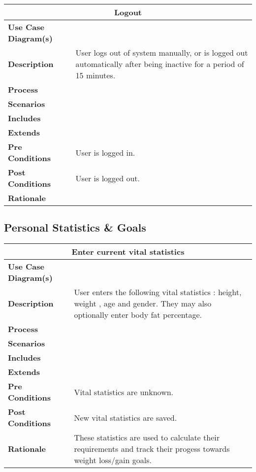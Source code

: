 \documentclass[12pt]{article}
\begin{document}
\begin{center}
\begin{tabularx}{\textwidth}{ |X|X|}
\hline
\multicolumn{2}{|c|}{\textbf{Logout}}\\
\hline
\hline
\textbf{Use Case Diagram(s)} & \\ \hline
\textbf{Description} &  User logs out of system manually, or is logged out automatically after being inactive for a period of 15 minutes. \\ \hline
\textbf{Process} & \\ \hline
\textbf{Scenarios} & \\ \hline
\textbf{Includes} & \\ \hline
\textbf{Extends} & \\ \hline
\textbf{Pre Conditions} & User is logged in.\\ \hline
\textbf{Post Conditions} & User is logged out.\\ \hline
\textbf{Rationale} & \\ \hline
\end{tabularx}
\end{center}


\subsection{Personal Statistics \& Goals}
\begin{center}
\begin{tabularx}{\textwidth}{ |X|X|}
\hline
\multicolumn{2}{|c|}{\textbf{Enter current vital statistics}}\\
\hline
\hline
\textbf{Use Case Diagram(s)} & \\ \hline
\textbf{Description} & User enters the following vital statistics : height, weight , age and gender. They may also optionally enter body fat percentage.  \\ \hline
\textbf{Process} & \\ \hline
\textbf{Scenarios} & \\ \hline
\textbf{Includes} & \\ \hline
\textbf{Extends} & \\ \hline
\textbf{Pre Conditions} & Vital statistics are unknown. \\ \hline
\textbf{Post Conditions} & New vital statistics are saved.\\ \hline
\textbf{Rationale} & These statistics are used to calculate their requirements and track their progess towards weight loss/gain goals.\\ \hline
\end{tabularx}
\end{center}
\end{document}

